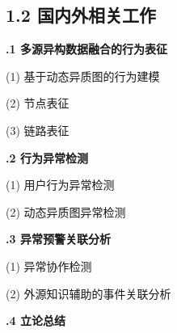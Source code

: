 \subsection{\sihao \songti \bfseries 1.2 国内外相关工作}

\textbf{.1 多源异构数据融合的行为表征} %

(1) 基于动态异质图的行为建模

(2) 节点表征

(3) 链路表征

\textbf{.2 行为异常检测} %

(1) 用户行为异常检测

(2) 动态异质图异常检测

\textbf{.3 异常预警关联分析} %

(1) 异常协作检测

(2) 外源知识辅助的事件关联分析

\textbf{.4 立论总结} %